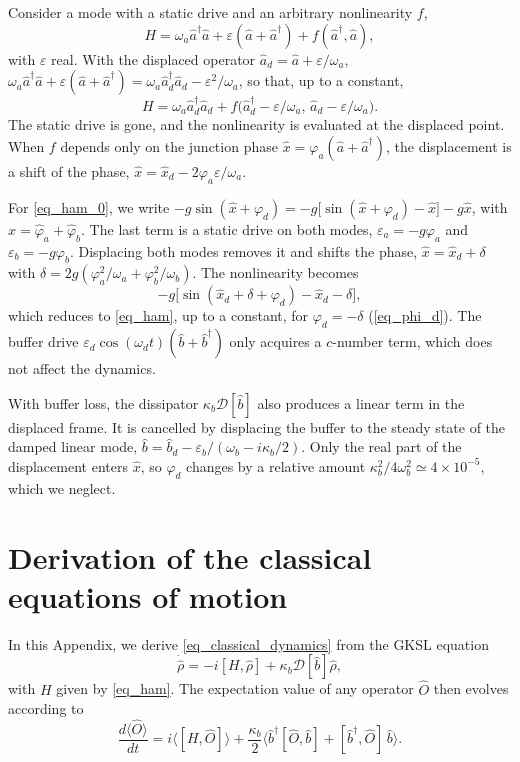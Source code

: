 \documentclass[aps,prx,reprint,floatfix,amsmath,amssymb,longbibliography]{revtex4-2}
\newcommand{\eps}{\varepsilon}
\newcommand{\da}{^\dagger}
\newcommand{\ha}{\hat{a}}
\newcommand{\hb}{\hat{b}}
\begin{document}
Consider a mode with a static drive and an arbitrary nonlinearity $f$,
\begin{equation}
    H = \omega_a\ha\da\ha + \eps(\ha+\ha\da) + f(\ha\da,\ha),
\end{equation}
with $\eps$ real. With the displaced operator $\ha_d=\ha+\eps/\omega_a$, $\omega_a\ha\da\ha+\eps(\ha+\ha\da)=\omega_a\ha_d\da\ha_d-\eps^2/\omega_a$, so that, up to a constant,
\begin{equation}
    H = \omega_a\ha_d\da\ha_d + f\bigl(\ha_d\da-\eps/\omega_a,\,\ha_d-\eps/\omega_a\bigr).
\end{equation}
The static drive is gone, and the nonlinearity is evaluated at the displaced point. When $f$ depends only on the junction phase $\hat x=\varphi_a(\ha+\ha\da)$, the displacement is a shift of the phase, $\hat x=\hat x_d-2\varphi_a\eps/\omega_a$.

For \cref{eq_ham_0}, we write $-g\sin(\hat x+\varphi_d)=-g\bigl[\sin(\hat x+\varphi_d)-\hat x\bigr]-g\hat x$, with $\hat x=\hat\varphi_a+\hat\varphi_b$. The last term is a static drive on both modes, $\eps_a=-g\varphi_a$ and $\eps_b=-g\varphi_b$. Displacing both modes removes it and shifts the phase, $\hat x=\hat x_d+\delta$ with $\delta=2g(\varphi_a^2/\omega_a+\varphi_b^2/\omega_b)$. The nonlinearity becomes
\begin{equation}
    -g\bigl[\sin(\hat x_d+\delta+\varphi_d)-\hat x_d-\delta\bigr],
\end{equation}
which reduces to \cref{eq_ham}, up to a constant, for $\varphi_d=-\delta$ (\cref{eq_phi_d}). The buffer drive $\eps_d\cos(\omega_dt)(\hb+\hb\da)$ only acquires a $c$-number term, which does not affect the dynamics.

With buffer loss, the dissipator $\kappa_b\mathcal D[\hb]$ also produces a linear term in the displaced frame. It is cancelled by displacing the buffer to the steady state of the damped linear mode, $\hb=\hb_d-\eps_b/(\omega_b-i\kappa_b/2)$. Only the real part of the displacement enters $\hat x$, so $\varphi_d$ changes by a relative amount $\kappa_b^2/4\omega_b^2\simeq4\times10^{-5}$, which we neglect.

\section{Derivation of the classical equations of motion}
\label{app:derivation_classical_equation}

In this Appendix, we derive \cref{eq_classical_dynamics} from the GKSL equation
\begin{equation}
    \dot{\hat\rho} = -i[H,\hat\rho] + \kappa_b\mathcal{D}[\hb]\hat\rho ,
    \label{eq_app_GKSL}
\end{equation}
with $H$ given by \cref{eq_ham}. The expectation value of any operator $\hat O$ then evolves according to
\begin{equation}
    \frac{d\langle\hat O\rangle}{dt} = i\langle[H,\hat O]\rangle
    + \frac{\kappa_b}{2}\bigl\langle \hb\da[\hat O,\hb] + [\hb\da,\hat O]\,\hb\bigr\rangle .
    \label{eq_app_heisenberg}
\end{equation}
\end{document}

